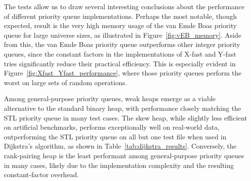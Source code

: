 The tests allow us to draw several interesting conclusions about the performance of different priority queue implementations. Perhaps the most notable, though expected, result is the very high memory usage of the van Emde Boas priority queue for large universe sizes, as illustrated in Figure~\ref{fig:vEB_memory}. Aside from this, the van Emde Boas priority queue outperforms other integer priority queues, since the constant factors in the implementations of X-fast and Y-fast tries significantly reduce their practical efficiency. This is especially evident in Figure~\ref{fig:Xfast_Yfast_performance}, where those priority queues perform the worst on large sets of random operations.

Among general-purpose priority queues, weak heaps emerge as a viable alternative to the standard binary heap, with performance closely matching the STL priority queue in many test cases. The skew heap, while slightly less efficient on artificial benchmarks, performs exceptionally well on real-world data, outperforming the STL priority queue on all but one test file when used in Dijkstra’s algorithm, as shown in Table~\ref{tab:dijkstra_results}. Conversely, the rank-pairing heap is the least performant among general-purpose priority queues in many cases, likely due to the implementation complexity and the resulting constant-factor overhead.

